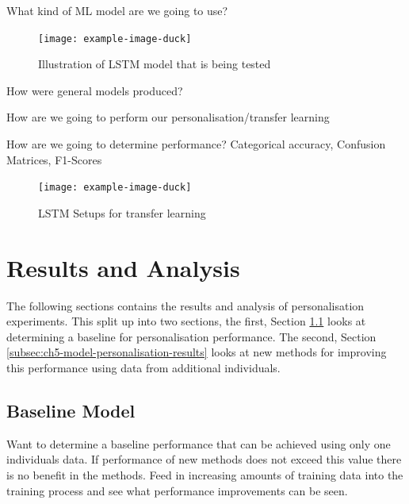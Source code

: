 What kind of ML model are we going to use?
\begin{figure}[htbp]
    \centering
    \texttt{[image: example-image-duck]}
    \caption{Illustration of LSTM model that is being tested}
    \label{fig:ch5_illustration_of_base_LSTM_model}
\end{figure}

How were general models produced?

How are we going to perform our personalisation/transfer learning

How are we going to determine performance? Categorical accuracy, Confusion Matrices, F1-Scores

\begin{figure}[htbp]
    \centering
    \texttt{[image: example-image-duck]}
    \caption{LSTM Setups for transfer learning}
    \label{fig:ch5_LSTM_model_transfer_learning}
\end{figure}


\section{Results and Analysis}
The following sections contains the results and analysis of personalisation experiments. This split up into two sections, the first, Section \ref{subsec:ch5-baseline-model-results} looks at determining a baseline for personalisation performance. The second, Section \ref{subsec:ch5-model-personalisation-results} looks at new methods for improving this performance using data from additional individuals.

\subsection{Baseline Model}
\label{subsec:ch5-baseline-model-results}
Want to determine a baseline performance that can be achieved using only one individuals data. If performance of new methods does not exceed this value there is no benefit in the methods. Feed in increasing amounts of training data into the training process and see what performance improvements can be seen.

